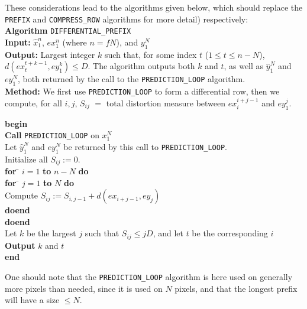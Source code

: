 \documentclass[11pt,a4paper]{article}
\newcommand{\xh}{\hat{x}}
\newcommand{\yh}{\hat{y}}
\begin{document}
These considerations lead to the algorithms given below, which should
replace the {\tt PREFIX} and {\tt COMPRESS\_ROW} algorithms 
for more detail) respectively:\\

{\bf Algorithm} {\tt DIFFERENTIAL\_PREFIX}\\
{\bf Input:} $\xh_1^n$, $ex_1^n$ (where $n=fN$), and $y_1^N$\\
{\bf Output:} Largest integer $k$ such that, for some index $t$ ($1
\leq t \leq n-N$), $d ( ex_t^{t+k-1} , ey_1^k ) \leq D$. The algorithm
outputs both $k$ and $t$, as well as $\yh_1^N$ and $ey_1^N$, both
returned by the call to the {\tt PREDICTION\_LOOP} algorithm.\\
{\bf Method:} We first use {\tt PREDICTION\_LOOP} to form a
differential row, then we compute, for all $i,j$, $S_{ij}$ $=$ total
distortion measure between $ex_i^{i+j-1}$ and $ey_1^j$.
\begin{tabbing}
{\bf begin}\=  \\
        \> {\bf Call} {\tt PREDICTION\_LOOP} on $x_1^N$\\
        \> Let $\yh_1^N$ and $ey_1^N$ be returned by this call to {\tt PREDICTION\_LOOP}.\\
        \> Initialize all $S_{ij} := 0$.\\
        \> {\bf for} \= $i=1$ {\bf to} $n-N$ {\bf do} \\
        \> \> {\bf for} \= $j=1$ {\bf to} $N$ {\bf do} \\
        \>  \>  \> Compute $S_{ij} := S_{i,j-1} + d(ex_{i+j-1}, ey_j)$\\
        \>  \> {\bf doend} \\
        \>  {\bf doend} \\
        \>  Let $k$ be the largest $j$ such that $S_{ij} \leq j D$, and let $t$ be the corresponding $i$\\
        \>  {\bf Output} $k$ and $t$\\
{\bf end}
\end{tabbing}

One should note that the {\tt PREDICTION\_LOOP} algorithm is here used
on generally more pixels than needed, since it is used on $N$ pixels,
and that the longest prefix will have a size $\leq N$.\\
\end{document}
